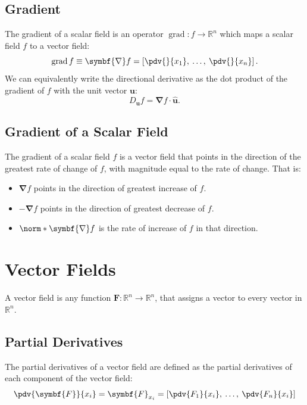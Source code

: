 \documentclass{article}
\DeclareMathOperator{\grad}{grad}
\begin{document}
\subsection{Gradient}
The gradient of a scalar field is an operator \(\grad : f \to
\mathbb{R}^n\) which maps a scalar field \(f\) to a vector field:
\begin{equation*}
    \grad{f} \equiv \symbf{\nabla} f = \left[ \pdv{}{x_1}, \: \ldots, \: \pdv{}{x_n} \right].
\end{equation*}
We can equivalently write the directional derivative as the dot product
of the gradient of \(f\) with the unit vector \(\mathbf{u}\):
\begin{equation*}
    D_{\mathbf{u}} f = \symbf{\nabla} f \cdot \hat{\mathbf{u}}.
\end{equation*}
\subsection{Gradient of a Scalar Field}
The gradient of a scalar field \(f\) is a vector field that points in
the direction of the greatest rate of change of \(f\), with magnitude
equal to the rate of change. That is:
\begin{itemize}
    \item \(\symbf{\nabla} f\) points in the direction of greatest increase of \(f\).
    \item \(-\symbf{\nabla} f\) points in the direction of greatest decrease of \(f\).
    \item \(\norm*{\symbf{\nabla} f}\) is the rate of increase of \(f\) in that direction.
\end{itemize}
\section{Vector Fields}
A vector field is any function \(\symbf{F} : \mathbb{R}^n \to
\mathbb{R}^n\), that assigns a vector to every vector in
\(\mathbb{R}^n\).
\subsection{Partial Derivatives}
The partial derivatives of a vector field are defined as the partial
derivatives of each component of the vector field:
\begin{equation*}
    \pdv{\symbf{F}}{x_i} = \symbf{F}_{x_i} = \left[ \pdv{F_1}{x_i}, \: \ldots, \: \pdv{F_n}{x_i} \right]
\end{equation*}
\end{document}
